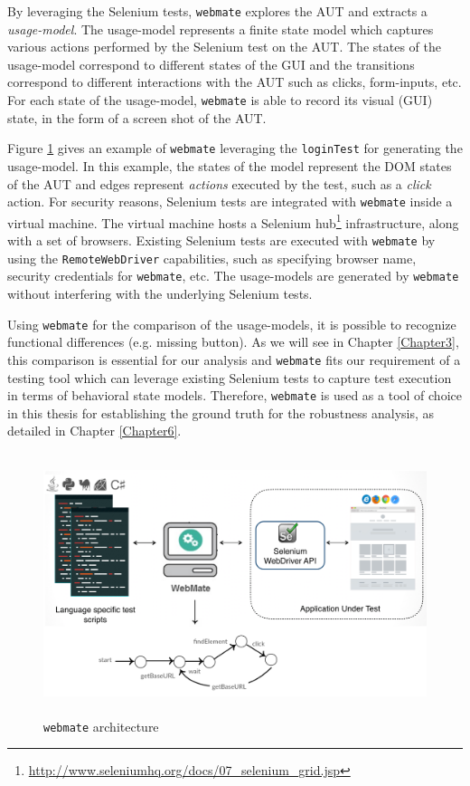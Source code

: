 By leveraging the Selenium tests, \texttt{webmate} explores the AUT and extracts a \textit{usage-model}. The usage-model represents a finite state model which captures various actions performed by the Selenium test on the AUT. The states of the usage-model correspond to different states of the GUI and the transitions correspond to different interactions with the AUT such as clicks, form-inputs, etc. For each state of the usage-model, \texttt{webmate} is able to record its visual (GUI) state, in the form of a screen shot of the AUT.

Figure \ref{fig:webmateArchitecture} gives an example of \texttt{webmate} leveraging the \texttt{loginTest} for generating the usage-model. In this example, the states of the model represent the DOM states of the AUT and edges represent \textit{actions} executed by the test, such as a \textit{click} action. For security reasons, Selenium tests are integrated with \texttt{webmate} inside a virtual machine. The virtual machine hosts a Selenium hub\footnote{\url{http://www.seleniumhq.org/docs/07_selenium_grid.jsp}} infrastructure, along with a set of browsers. Existing Selenium tests are executed with \texttt{webmate} by using the \texttt{RemoteWebDriver} capabilities, such as specifying browser name, security credentials for \texttt{webmate}, etc. The usage-models are generated by \texttt{webmate} without interfering with the underlying Selenium tests. 

Using \texttt{webmate} for the comparison of the usage-models, it is possible to recognize functional differences (e.g. missing button). As we will see in Chapter \ref{Chapter3}, this comparison is essential for our analysis and \texttt{webmate} fits our requirement of a testing tool which can leverage existing Selenium tests to capture test execution in terms of behavioral state models. Therefore, \texttt{webmate} is used as a tool of choice in this thesis for establishing the ground truth for the robustness analysis, as detailed in Chapter \ref{Chapter6}.

\begin{figure}
\makeatletter 
\makeatother
    \centering
  \includegraphics[width=5.5in,height=3in]{./Figures/webmate-state-graph}
  \caption{\texttt{webmate} architecture}
  \label{fig:webmateArchitecture} 
\end{figure}


